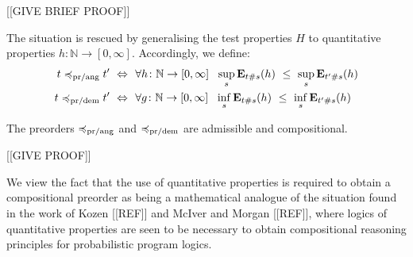 [[GIVE BRIEF PROOF]]

The situation is rescued by generalising the test properties $H$ to 
quantitative properties $h \colon \mathbb{N} \to [0,\infty]$. 
Accordingly, we define:
\begin{align*}
t \preccurlyeq_{\text{pr/ang}} t' ~ \Leftrightarrow ~ ~& \forall h \colon \mathbb{N} \to [0,\infty]~~ \sup_s  \mathbf{E}_{t\#s} (h)~ \leq~ \sup_s \mathbf{E}_{t'\#s} (h)
\\
t \preccurlyeq_{\text{pr/dem}} t' ~ \Leftrightarrow ~ ~& \forall g \colon \mathbb{N} \to [0,\infty]~~ \inf_s  \mathbf{E}_{t\#s} (h)~ \leq~ \inf_s \mathbf{E}_{t'\#s} (h)
\end{align*}
\begin{aproposition}
The preorders $\preccurlyeq_{\text{pr/ang}}$ and $\preccurlyeq_{\text{pr/dem}}$ are admissible and compositional.
\end{aproposition}

[[GIVE PROOF]]

We view the fact that the use of quantitative properties is required to obtain a compositional preorder as being
a mathematical analogue of the situation found in the work of Kozen [[REF]] and McIver and Morgan [[REF]], where 
logics of quantitative properties are seen to be necessary to obtain compositional reasoning principles for 
probabilistic program logics.
